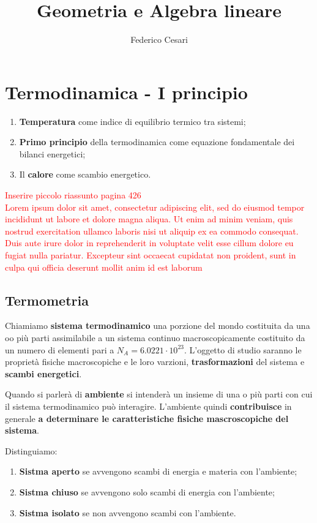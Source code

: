 \documentclass[x11names]{report}
\title{Geometria e Algebra lineare}
\author{Federico Cesari}
\date{}
\begin{document}
\tableofcontents

\chapter{Termodinamica - I principio}
\begin{es}{}
	\begin{enumerate}
		\item \textbf{Temperatura} come indice di equilibrio termico tra sistemi;
		\item \textbf{Primo principio} della termodinamica come equazione fondamentale dei bilanci energetici;
		\item Il \textbf{calore} come scambio energetico.
	\end{enumerate}
\end{es}
	

\textcolor{red}{Inserire piccolo riassunto pagina 426}\\

\textcolor{red}{Lorem ipsum dolor sit amet, consectetur adipiscing elit, sed do eiusmod tempor incididunt ut labore et dolore magna aliqua. Ut enim ad minim veniam, quis nostrud exercitation ullamco laboris nisi ut aliquip ex ea commodo consequat. Duis aute irure dolor in reprehenderit in voluptate velit esse cillum dolore eu fugiat nulla pariatur. Excepteur sint occaecat cupidatat non proident, sunt in culpa qui officia deserunt mollit anim id est laborum}


\section{Termometria}
Chiamiamo \textbf{sistema termodinamico} una porzione del mondo costituita da una oo più parti assimilabile a un sistema continuo macroscopicamente costituito da un numero di elementi pari a \(N_A = 6.0221 \cdot 10^{23}\). L'oggetto di studio saranno le proprietà fisiche macroscopiche e le loro varzioni, \textbf{trasformazioni} del sistema e \textbf{scambi energetici}.

Quando si parlerà di \textbf{ambiente} si intenderà un insieme di una o più parti con cui il sistema termodinamico può interagire. L'ambiente quindi \textbf{contribuisce} in generale \textbf{a determinare le caratteristiche fisiche mascroscopiche del sistema}.

Distinguiamo:
\begin{enumerate}
	\item \textbf{Sistma aperto} se avvengono scambi di energia e materia con l'ambiente;
	\item \textbf{Sistma chiuso} se avvengono solo scambi di energia con l'ambiente;
	\item \textbf{Sistma isolato} se non avvengono scambi con l'ambiente.
\end{enumerate}
\end{document}
